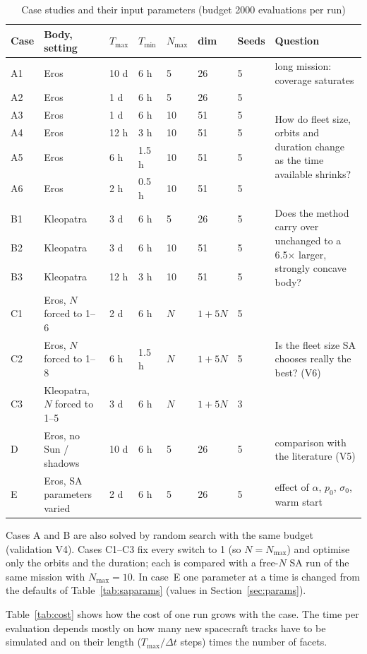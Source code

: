\begin{table}[htbp]
\centering
\caption{Case studies and their input parameters (budget 2000 evaluations per run)}
\label{tab:cases}
\footnotesize
\begin{tabularx}{\textwidth}{@{}p{0.5cm}p{2.9cm}p{0.9cm}p{0.9cm}p{0.8cm}p{0.8cm}p{0.6cm}X@{}}
\toprule
Case & Body, setting & $T_{\max}$ & $T_{\min}$ & $N_{\max}$ & dim & Seeds & Question \\
\midrule
A1 & Eros & 10 d & 6 h & 5 & 26 & 5 & long mission: coverage saturates \\
A2 & Eros & 1 d & 6 h & 5 & 26 & 5 & \multirow{5}{=}{How do fleet size, orbits and duration change as the time available shrinks?} \\
A3 & Eros & 1 d & 6 h & 10 & 51 & 5 & \\
A4 & Eros & 12 h & 3 h & 10 & 51 & 5 & \\
A5 & Eros & 6 h & 1.5 h & 10 & 51 & 5 & \\
A6 & Eros & 2 h & 0.5 h & 10 & 51 & 5 & \\
\midrule
B1 & Kleopatra & 3 d & 6 h & 5 & 26 & 5 & \multirow{3}{=}{Does the method carry over unchanged to a 6.5$\times$ larger, strongly concave body?} \\
B2 & Kleopatra & 3 d & 6 h & 10 & 51 & 5 & \\
B3 & Kleopatra & 12 h & 3 h & 10 & 51 & 5 & \\
\midrule
C1 & Eros, $N$ forced to 1--6 & 2 d & 6 h & $N$ & $1{+}5N$ & 5 & \multirow{3}{=}{Is the fleet size \ac{SA} chooses really the best? (V6)} \\
C2 & Eros, $N$ forced to 1--8 & 6 h & 1.5 h & $N$ & $1{+}5N$ & 5 & \\
C3 & Kleopatra, $N$ forced to 1--5 & 3 d & 6 h & $N$ & $1{+}5N$ & 3 & \\
\midrule
D & Eros, no Sun / shadows & 10 d & 6 h & 5 & 26 & 5 & comparison with the literature (V5) \\
E & Eros, SA parameters varied & 2 d & 6 h & 5 & 26 & 5 & effect of $\alpha$, $p_0$, $\sigma_0$, warm start \\
\bottomrule
\end{tabularx}
\end{table}

Cases A and B are also solved by random search with the same budget (validation V4). Cases C1--C3
fix every switch to 1 (so $N=N_{\max}$) and optimise only the orbits and the duration; each is
compared with a free-$N$ \ac{SA} run of the same mission with $N_{\max}=10$. In case~E one
parameter at a time is changed from the defaults of Table~\ref{tab:saparams} (values in
Section~\ref{sec:params}).

Table~\ref{tab:cost} shows how the cost of one run grows with the case. The time per evaluation
depends mostly on how many new spacecraft tracks have to be simulated and on their length
($T_{\max}/\Delta t$ steps) times the number of facets.


